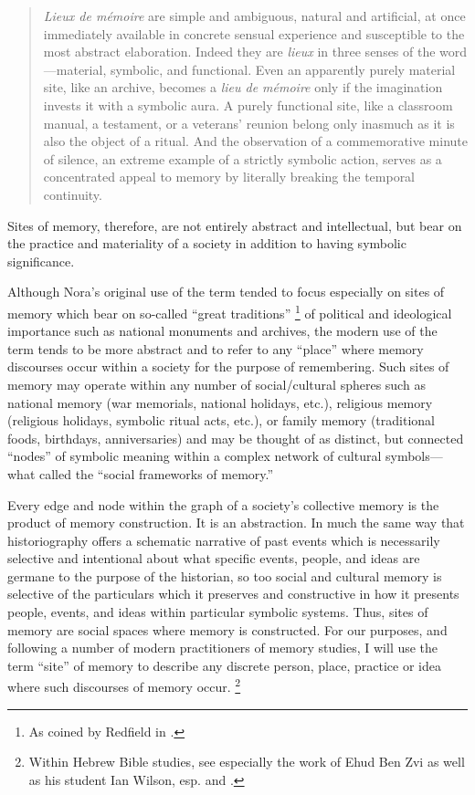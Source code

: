 \begin{quote}
    \emph{Lieux de mémoire} are simple and ambiguous, natural and artificial, at once immediately available in concrete sensual experience and susceptible to the most abstract elaboration. Indeed they are \emph{lieux} in three senses of the word---material, symbolic, and functional. Even an apparently purely material site, like an archive, becomes a \emph{lieu de mémoire} only if the imagination invests it with a symbolic aura. A purely functional site, like a classroom manual, a testament, or a veterans' reunion belong only inasmuch as it is also the object of a ritual. And the observation of a commemorative minute of silence, an extreme example of a strictly symbolic action, serves as a concentrated appeal to memory by literally breaking the temporal continuity.%
        \autocite[18--19]{nora_representations1989}
\end{quote}

\noindent
Sites of memory, therefore, are not entirely abstract and intellectual, but bear on the practice and materiality of a society in addition to having symbolic significance.

Although Nora's original use of the term tended to focus especially on sites of memory which bear on so-called ``great traditions''%
    \footnote{%
        As coined by Redfield in 
        \cite*[41--42]{redfield1956}.}
of political and ideological importance such as national monuments and archives, the modern use of the term tends to be more abstract and to refer to any ``place'' where memory discourses occur within a society for the purpose of remembering. Such sites of memory may operate within any number of social/cultural spheres such as national memory (war memorials, national holidays, etc.), religious memory (religious holidays, symbolic ritual acts, etc.), or family memory (traditional foods, birthdays, anniversaries) and may be thought of as distinct, but connected ``nodes'' of symbolic meaning within a complex network of cultural symbols---what \halbwachs called the ``social frameworks of memory.''%
    \autocite[38]{halbwachs1992}  

Every edge and node within the graph of a society's collective memory is the product of memory construction. It is an abstraction. In much the same way that historiography offers a schematic narrative of past events which is necessarily selective and intentional about what specific events, people, and ideas are germane to the purpose of the historian, so too social and cultural memory is selective of the particulars which it preserves and constructive in how it presents people, events, and ideas within particular symbolic systems. Thus, sites of memory are social spaces where memory is constructed. For our purposes, and following a number of modern practitioners of memory studies, I will use the term ``site'' of memory to describe any discrete person, place, practice or idea where such discourses of memory occur.%
    \footnote{%
        Within Hebrew Bible studies, see especially the work of Ehud Ben Zvi as well as his student Ian Wilson, esp.
        \cite[72--74]{benzvi_st2017} and 
        \cite[25--26]{wilson2017}.}

